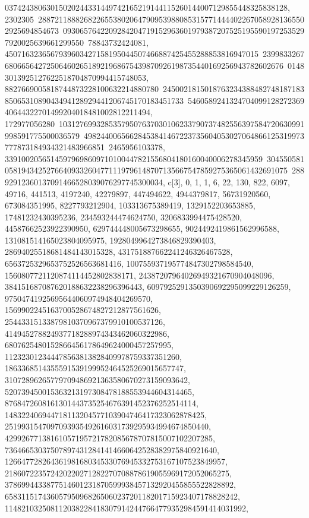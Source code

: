 {{{03742438063015020244331449742165219144115260144007129855448325838128, 2302305\
28872118882682265538020647909539880853157714444022670589281365502925694854673\
09306576422092842047191529636019793872075251955901972535297920025639661299550\
78843732424081, 4507163236567939603427158195044507466887425455288853816947015\
23998332676806656427250646026518921968675439870926198735440169256943782602676\
01483013925127622518704870994415748053, 8827669005818744873228100632214880780\
24500218150187632343884827481871838506531089043494128929441206745170183451733\
546058924132470409912827236940644322701499204018481002812211494, 172977056280\
10312769932853579507637030106233790737482556397584720630991998591775500036579\
49824400656628453841467223735604053027064866125319973777873184934321483966851\
2465956103378, 33910020565145979698609710100447821556804180160040006278345959\
30455058105819434252766409332604771119796148707135667547859275365061432691075\
28892912360137091466528039076297745300034}}, 
 {c[3], {0, 1, 1, 6, 22, 130, 822, 6097, 49716, 441513, 4197240, 42279897, 
   447494622, 4944379817, 56731920560, 673084351995, 8227793212904, 
   103313675389419, 1329152203653885, 17481232430395236, 234593244474624750, 
   3206833994475428520, 44587662523922390950, 629744448005673298655, 
   9024492419861562996588, 131081514165023804095975, 
   1928049964273846829390403, 28694025518681484143015328, 
   431751887662241246326467528, 6563725329653752526563681416, 
   100755937195774847302798584540, 1560807721120874114452802838171, 
   24387207964026949321670904048096, 384151687087620188632238296396443, 
   6097925291350390692295099229126259, 97504741925695644060974948404269570, 
   1569902245163700528674827212877561626, 
   25443315133879810370967379910100537126, 
   414945278824937718288974343462060322986, 
   6807625480152866456178649624000457257995, 
   112323012344478563813828409978759337351260, 
   1863368514355591539199952464525269015657747, 
   31072896265779709486921363580670273159093642, 
   520739450015363213197308478188553944604314465, 
   8768472608161301443735254676391452376252514114, 
   148322406944718113204577103904746417323062878425, 
   2519931547097093935492616031739295934994674850440, 
   42992677138161057195721782085678707815007102207285, 
   736466530375078974312841414660642528382975840921640, 
   12664772826436198168034533076945332753167107523849957, 
   218607223572420220271282270708878619055969172052065275, 
   3786994433877514601231870599938457132920455855522828892, 
   65831151743605795096826506023720118201715923407178828242, 
   1148210325081120382284183079142447664779352984591414031992, 
}}}
